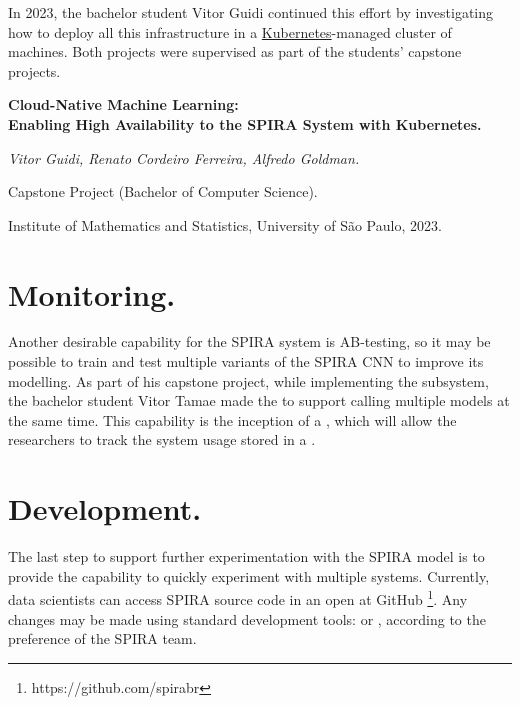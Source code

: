   In 2023, the bachelor student Vitor
  Guidi continued this effort by investigating how to deploy all this
  infrastructure in a \href{https://kubernetes.io/}{Kubernetes}-managed
  cluster of machines. Both projects were supervised as part of the
  students' capstone projects.
  \begin{supervision}
    \label{sup:tcc_guidi}
    \noindent\textbf{%
      Cloud-Native Machine Learning: \\
      Enabling High Availability to the SPIRA System with Kubernetes.
    }
  
    \noindent%
    \emph{%
      Vitor Guidi,
      Renato Cordeiro Ferreira,
      Alfredo Goldman.
    }
  
    \noindent%
    Capstone Project (Bachelor of Computer Science).
  
    \noindent%
    Institute of Mathematics and Statistics, University of São Paulo, 2023.
  \end{supervision}
  
  \section{Monitoring.}\label{sec:spira_monitoring}
  Another desirable capability for the SPIRA system is AB-testing,
  so it may be possible to train and test multiple variants of the SPIRA
  CNN to improve its modelling. As part of his capstone project,
  while implementing the  subsystem,
  the bachelor student Vitor Tamae made the 
  to support calling multiple models at the same time. This capability is
  the inception of a , which will
  allow the researchers to track the system usage stored in a
  .
  
  \section{Development.}
  \label{sec:spira_development_ci}
  The last step to support further experimentation with the SPIRA model
  is to provide the capability to quickly experiment with multiple systems.
  Currently, data scientists can access SPIRA source code in an open
   at GitHub%
  \footnote{https://github.com/spirabr}.
  Any changes may be made using standard development tools:
   or ,
  according to the preference of the SPIRA team.
  
